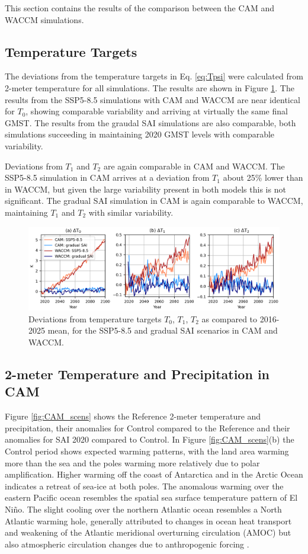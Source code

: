 This section contains the results of the comparison between the CAM and WACCM simulations. 

\subsection{Temperature Targets}
The deviations from the temperature targets in Eq. \ref{eq:Tpsi} were calculated from 2-meter temperature for all simulations. The results are shown in Figure \ref{fig:Tgrad1}. The results from the SSP5-8.5 simulations with CAM and WACCM are near identical for $T_0$, showing comparable variability and arriving at virtually the same final GMST. The results from the graudal SAI simulations are also comparable, both simulations succeeding in maintaining 2020 GMST levels with comparable variability. 

Deviations from $T_1$ and $T_2$ are again comparable in CAM and WACCM. The SSP5-8.5 simulation in CAM arrives at a deviation from $T_1$ about 25\% lower than in WACCM, but given the large variability present in both models this is not significant. The gradual SAI simulation in CAM is again comparable to WACCM, maintaining $T_1$ and $T_2$ with similar variability. 

\begin{figure}[H]
	\centering
	\includegraphics[width=0.95\linewidth]{images/Tgrad_v.png}
	\caption{Deviations from temperature targets $T_0$, $T_1$, $T_2$ as compared to 2016-2025 mean, for the SSP5-8.5 and gradual SAI scenarios in CAM and WACCM.}
	\label{fig:Tgrad1}
\end{figure}


\subsection{2-meter Temperature and Precipitation in CAM}
Figure \ref{fig:CAM_scens} shows the Reference 2-meter temperature and precipitation, their anomalies for Control compared to the Reference and their anomalies for SAI 2020 compared to Control. In Figure \ref{fig:CAM_scens}(b) the Control period shows expected warming patterns, with the land area warming more than the sea and the poles warming more relatively due to polar amplification. Higher warming off the coast of Antarctica and in the Arctic Ocean indicates a retreat of sea-ice at both poles. The anomalous warming over the eastern Pacific ocean resembles the spatial sea surface temperature pattern of El Ni\~no. The slight cooling over the northern Atlantic ocean resembles a North Atlantic warming hole, generally attributed to changes in ocean heat transport and weakening of the Atlantic meridional overturning circulation (AMOC) but also atmospheric circulation changes due to anthropogenic forcing \parencite{menary2018anatomy,he2022}. 

